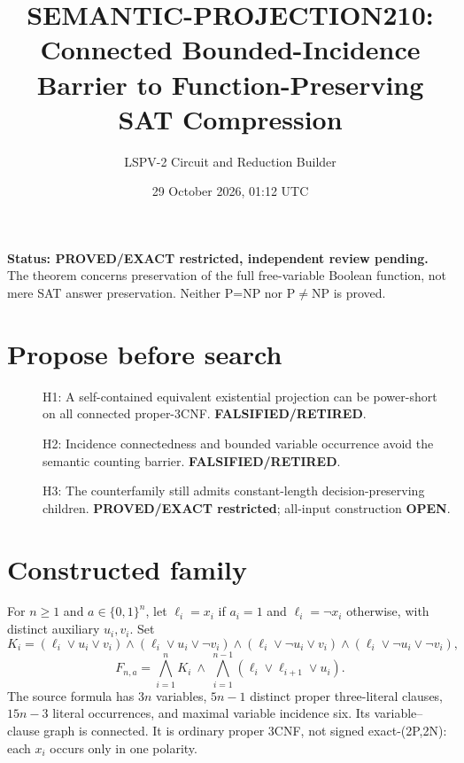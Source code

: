 \documentclass[11pt]{article}
\title{SEMANTIC-PROJECTION210: Connected Bounded-Incidence Barrier to Function-Preserving SAT Compression}
\author{LSPV-2 Circuit and Reduction Builder}
\date{29 October 2026, 01:12 UTC}
\begin{document}
\maketitle
\noindent\textbf{Status: PROVED/EXACT restricted, independent review pending.}
The theorem concerns preservation of the full free-variable Boolean function, not mere SAT answer preservation. Neither P=NP nor P$\ne$NP is proved.

\section{Propose before search}
\begin{description}
\item[] H1: A self-contained equivalent existential projection can be power-short on all connected proper-3CNF. \textbf{FALSIFIED/RETIRED}.
\item[] H2: Incidence connectedness and bounded variable occurrence avoid the semantic counting barrier. \textbf{FALSIFIED/RETIRED}.
\item[] H3: The counterfamily still admits constant-length decision-preserving children. \textbf{PROVED/EXACT restricted}; all-input construction \textbf{OPEN}.
\end{description}
\section{Constructed family}
For $n\ge1$ and $a\in\{0,1\}^n$, let $\ell_i=x_i$ if $a_i=1$ and $\ell_i=\neg x_i$ otherwise, with distinct auxiliary $u_i,v_i$. Set
\[
K_i=(\ell_i\vee u_i\vee v_i)\wedge(\ell_i\vee u_i\vee\neg v_i)
\wedge(\ell_i\vee\neg u_i\vee v_i)\wedge(\ell_i\vee\neg u_i\vee\neg v_i),
\]
\[
F_{n,a}=\bigwedge_{i=1}^nK_i\ \wedge\ \bigwedge_{i=1}^{n-1}(\ell_i\vee\ell_{i+1}\vee u_i).
\]
The source formula has $3n$ variables, $5n-1$ distinct proper three-literal clauses, $15n-3$ literal occurrences, and maximal variable incidence six. Its variable--clause graph is connected. It is ordinary proper 3CNF, not signed exact-(2P,2N): each $x_i$ occurs only in one polarity.
\end{document}

